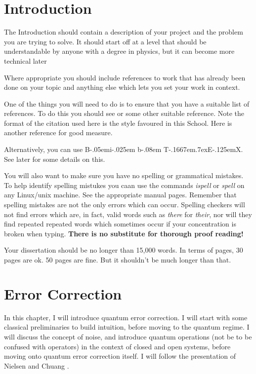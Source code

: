 \documentclass[12pt,a4paper]{report}
\def\BibTeX{{\rm B\kern-.05em{\sc i\kern-.025em b}\kern-.08em
    T\kern-.1667em\lower.7ex\hbox{E}\kern-.125emX}}
\numberwithin{equation}{section}
\theoremstyle{definition}
\theoremstyle{theorem}
\theoremstyle{theorem}
\theoremstyle{example}
\theoremstyle{definition}
\begin{document}
\tableofcontents
\listoftables
\listoffigures


\chapter{Introduction}
The Introduction should contain a description of your project and the
problem you are trying to solve. It should start off at a level that
should be understandable by anyone with a degree in physics, but it
can become more technical later

Where appropriate you should include references to work that has
already been done on your topic and anything else which lets you set
your work in context.

One of the things you will need to do is to ensure that you have a
suitable list of references.  To do this you should see \cite{ref:lam}
or some other suitable reference.  Note the format of the citation used
here is the style favoured in this School.  Here is another
reference \cite{ref:bloggs} for good measure.

Alternatively, you can use \BibTeX. See later for some details on this.

You will also want to make sure you have no spelling or grammatical
mistakes. To help identify spelling mistukes you caan use the
commands \emph{ispell} or \emph{spell} on any Linux/unix machine. See
the appropriate manual pages. Remember that spelling mistakes are not
the only errors which can occur. Spelling checkers will not find
errors which are, in fact, valid words such as \emph{there} for {\em
  their}, nor will they find repeated repeated words which sometimes
occur if your concentration is broken when typing. \textbf{There is no
  substitute for thorough proof reading!}

Your dissertation should be no longer than 15,000 words. In terms of
pages, 30 pages are ok. 50 pages are fine. But it shouldn't be
much longer than that.


\chapter{Error Correction}

In this chapter, I will introduce quantum error correction. I will start with some classical preliminaries to build intuition, before moving to the quantum regime. I will discuss the concept of noise, and introduce quantum operations (not be to be confused with operators) in the context of closed and open systems, before moving onto quantum error correction itself. I will follow the presentation of Nielsen and Chuang \cite{NielsenChuang}.
\end{document}
